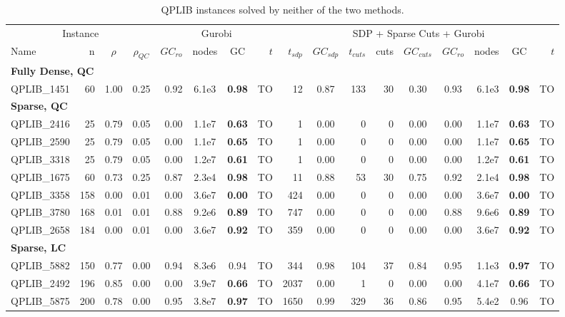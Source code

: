 \documentclass[twoside]{article}
\begin{document}
\begin{table}[h!]
{				%
			\begin{tabular}{lrcc|rccr|rcrrccrcr}
				\toprule
				\multicolumn{4}{c|}{Instance} & \multicolumn{4}{c|}{Gurobi} & \multicolumn{9}{c}{SDP + Sparse Cuts + Gurobi} \\
				Name & n & $\rho$ & $\rho_{QC}$ & $GC_{ro}$ & nodes & GC & $t$ & $t_{sdp}$ & $GC_{sdp}$ & $t_{cuts}$ & cuts & $GC_{cuts}$ & $GC_{ro}$ & nodes & GC & $t$ \\
				\midrule
				\multicolumn{15}{l}{\textbf{Fully Dense, QC}}\\
				\addlinespace[2pt]
				QPLIB\_1451 & 60 & 1.00 & 0.25 & 0.92 & 6.1e3 & \textbf{0.98} & TO & 12 & 0.87 & 133 & 30 & 0.30 & 0.93 & 6.1e3 & \textbf{0.98} & TO \\
				\midrule
				\multicolumn{15}{l}{\textbf{Sparse, QC}}\\
				\addlinespace[2pt]
				QPLIB\_2416 & 25 & 0.79 & 0.05 & 0.00 & 1.1e7 & \textbf{0.63} & TO & 1 & 0.00 & 0 & 0 & 0.00 & 0.00 & 1.1e7 & \textbf{0.63} & TO \\
				QPLIB\_2590 & 25 & 0.79 & 0.05 & 0.00 & 1.1e7 & \textbf{0.65} & TO & 1 & 0.00 & 0 & 0 & 0.00 & 0.00 & 1.1e7 & \textbf{0.65} & TO \\
				QPLIB\_3318 & 25 & 0.79 & 0.05 & 0.00 & 1.2e7 & \textbf{0.61} & TO & 1 & 0.00 & 0 & 0 & 0.00 & 0.00 & 1.2e7 & \textbf{0.61} & TO \\
				QPLIB\_1675 & 60 & 0.73 & 0.25 & 0.87 & 2.3e4 & \textbf{0.98} & TO & 11 & 0.88 & 53 & 30 & 0.75 & 0.92 & 2.1e4 & \textbf{0.98} & TO \\
				QPLIB\_3358 & 158 & 0.00 & 0.01 & 0.00 & 3.6e7 & \textbf{0.00} & TO & 424 & 0.00 & 0 & 0 & 0.00 & 0.00 & 3.6e7 & \textbf{0.00} & TO \\
				QPLIB\_3780 & 168 & 0.01 & 0.01 & 0.88 & 9.2e6 & \textbf{0.89} & TO & 747 & 0.00 & 0 & 0 & 0.00 & 0.88 & 9.6e6 & \textbf{0.89} & TO \\
				QPLIB\_2658 & 184 & 0.00 & 0.01 & 0.00 & 3.6e7 & \textbf{0.92} & TO & 359 & 0.00 & 0 & 0 & 0.00 & 0.00 & 3.6e7 & \textbf{0.92} & TO \\
				\midrule
				\multicolumn{15}{l}{\textbf{Sparse, LC}}\\
				\addlinespace[2pt]
				QPLIB\_5882 & 150 & 0.77 & 0.00 & 0.94 & 8.3e6 & 0.94 & TO & 344 & 0.98 & 104 & 37 & 0.84 & 0.95 & 1.1e3 & \textbf{0.97} & TO \\
				QPLIB\_2492 & 196 & 0.85 & 0.00 & 0.00 & 3.9e7 & \textbf{0.66} & TO & 2037 & 0.00 & 1 & 0 & 0.00 & 0.00 & 4.1e7 & \textbf{0.66} & TO \\
				QPLIB\_5875 & 200 & 0.78 & 0.00 & 0.95 & 3.8e7 & \textbf{0.97} & TO & 1650 & 0.99 & 329 & 36 & 0.86 & 0.95 & 5.4e2 & 0.96 & TO \\
				\bottomrule
		\end{tabular}}
		\caption{QPLIB instances solved by neither of the two methods.}
		\label{tableUnsolvedQPLIB}
	\end{table}
	
\end{document}
